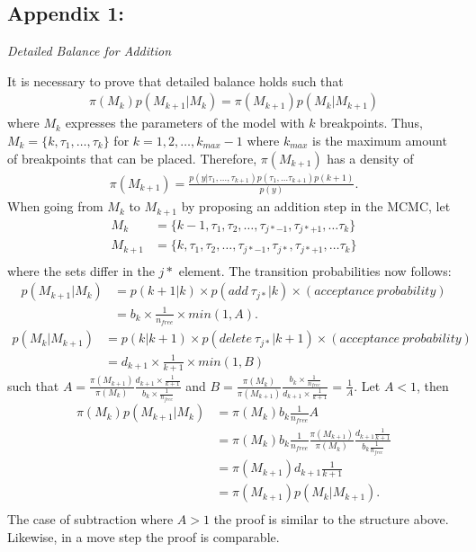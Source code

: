 \documentclass[submit]{smj}
\begin{document}
\subsection{Appendix 1:}
\begin{center}
\textit{Detailed Balance for Addition} 
\end{center}
It is necessary to prove that detailed balance holds such that 
\begin{align*}
\pi (M_k)p(M_{k+1} | M_k ) = \pi(M_{k+1}) p(M_k | M_{k+1})
\end{align*}
where $M_k$ expresses the parameters of the model with $k$ breakpoints. 
Thus,  $M_k = \{k, \tau_1 , \dots, \tau_k \}$ for $k=1,2, \dots, k_{max}-1$ where $k_{max}$ is the maximum amount of breakpoints that can be placed. 
Therefore,  $\pi(M_{k+1})$ has a density of 
\begin{align*}
\pi(M_{k+1}) = \frac{p(y | \tau_1, \dots, \tau_{k+1}) p(\tau_1, \dots \tau_{k+1}) p(k+1)}{p(y)}.
\end{align*}
When going from $M_k$ to $M_{k+1}$ by proposing an addition step in the MCMC, let 
\begin{align*}
M_{k} &= \{k-1, \tau_1, \tau_2, \dots, \tau_{j*-1}, \tau_{j*+1}, \dots \tau_k \}\\
M_{k+1} &= \{k, \tau_1, \tau_2, \dots, \tau_{j*-1}, \tau_{j*}, \tau_{j*+1}, \dots \tau_k\} \\
\end{align*}
where the sets differ in the $j*$ element. The transition probabilities now follows:
\begin{align*}
p(M_{k+1} | M_{k} ) &= p(k+1|k) \times p(add \ \tau_{j*} | k) \times (acceptance \  probability) \\
&= b_{k} \times \frac{1}{n_{free}} \times min(1,A).
\end{align*}
\begin{align*}
p(M_{k} | M_{k+1}) &= p(k|k+1) \times p(delete \ \tau_{j*} | k+1) \times (acceptance \  probability) \\
&= d_{k+1} \times \frac{1}{k+1} \times min(1,B)
\end{align*}
such that $A = \frac{\pi(M_{k+1})}{\pi(M_{k})} \frac{d_{k+1}\times \frac{1}{k+1}}{b_{k} \times \frac{1}{n_{free}}}$  and $B = \frac{\pi(M_{k})}{\pi(M_{k+1})} \frac{b_{k} \times  \frac{1}{n_{free}}}{d_{k+1} \times \frac{1}{k+1}} = \frac{1}{A}$. 
Let $A<1$, then 
\begin{align*}
\pi(M_k) p(M_{k+1} | M_k) &= \pi(M_k)b_k \frac{1}{n_{free}} A  \\
&= \pi(M_k)b_k \frac{1}{n_{free}} \frac{\pi(M_{k+1})}{\pi(M_k)} \frac{d_{k+1} \frac{1}{k+1}}{b_k \frac{1}{n_{free}}} \\
&= \pi(M_{k+1}) d_{k+1} \frac{1}{k+1} \\
&= \pi(M_{k+1})p(M_k |M_{k+1}).\\
\end{align*}
The case of subtraction where $A >1$ the proof is similar to the structure above. Likewise, in a move step the proof is comparable. 
\end{document}
